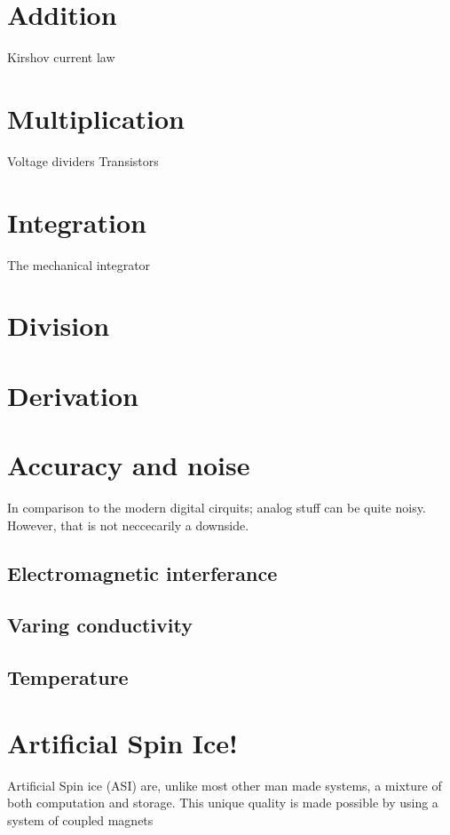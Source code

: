 \section{Addition}
Kirshov current law
\section{Multiplication}
Voltage dividers
Transistors
\section{Integration}
The mechanical integrator
\section{Division}
\section{Derivation}
\section{Accuracy and noise}
In comparison to the modern digital cirquits; analog stuff can be quite noisy. 
However, that is not neccecarily a downside.
\subsection{Electromagnetic interferance}
\subsection{Varing conductivity}
\subsection{Temperature}
\section{Artificial Spin Ice!}
Artificial Spin ice (ASI) are, unlike most other man made systems, a mixture of both computation and storage.
This unique quality is made possible by using a system of coupled magnets